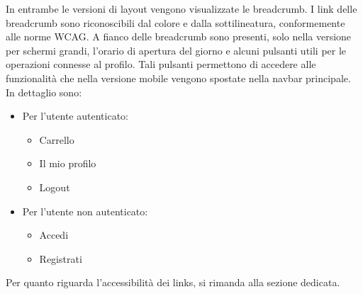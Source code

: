 In entrambe le versioni di layout vengono visualizzate le breadcrumb. I link delle breadcrumb sono riconoscibili dal colore e dalla sottilineatura, conformemente alle norme WCAG. A fianco delle breadcrumb sono presenti, solo nella versione per schermi grandi, l'orario di apertura del giorno e alcuni pulsanti utili per le operazioni connesse al profilo. Tali pulsanti permettono di accedere alle funzionalità che nella versione mobile vengono spostate nella navbar principale. In dettaglio sono:
\begin{itemize}
    \item Per l'utente autenticato:
    \begin{itemize}
        \item Carrello
        \item Il mio profilo
        \item Logout
    \end{itemize}
    \item Per l'utente non autenticato:
    \begin{itemize}
        \item Accedi
        \item Registrati
    \end{itemize}
\end{itemize}
Per quanto riguarda l'accessibilità dei links, si rimanda alla sezione dedicata.

